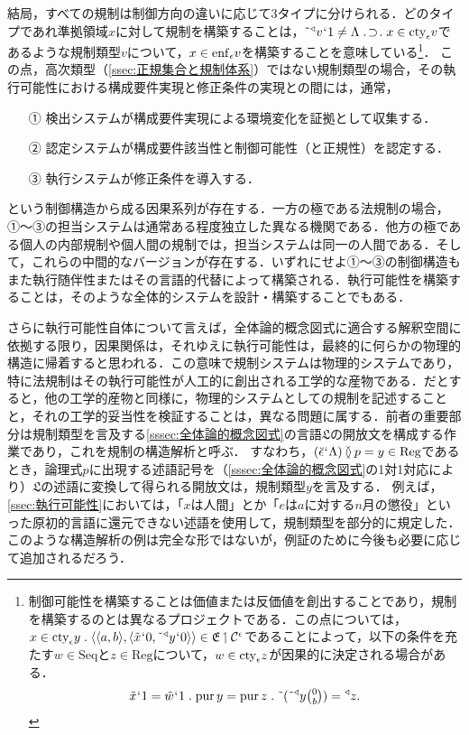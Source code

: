 結局，すべての規制は制御方向の違いに応じて3タイプに分けられる．どのタイプであれ準拠領域$x$に対して規制を構築することは，$ \tildel{\trgl{v}}\fap 1 \neq\Lambda \case{1}{1}{1}x\in\cty{\epsilon}v $であるような規制類型$v$について，$ x\in\mathrm{enf}_{\epsilon}v $を構築することを意味している\footnote{
    制御可能性を構築することは価値または反価値を創出することであり，規制を構築するのとは異なるプロジェクトである．この点については，
    $ x\in\cty{\epsilon}y \con{1} \orp{\orp{a,b},\orp{\tilde{x}\fap 0,\tildel{\trgl{y}}\fap 0}}\in \mathfrak{E}\uphl\mathcal{C}^\epsilon $であることによって，以下の条件を充たす$ w\in\mathrm{Seq} $と$ z\in\mathrm{Reg} $について，$ w\in \mathrm{cty}_{\epsilon}z $が因果的に決定される場合がある．
    \[
        \tilde{x}\fap 1 = \tilde{w}\fap 1\con{1}\mathrm{pur}\,y = \mathrm{pur}\,z\con{1}\tildel{(\tildel{\trgl{y}}\tbinom{0}{b})} = \trgl{z}.
    \]}．
この点，高次類型（\ref{ssec:正規集合と規制体系}）ではない規制類型の場合，その執行可能性における構成要件実現と修正条件の実現との間には，通常，
\begin{enumerate}
    \item[①] 検出システムが構成要件実現による環境変化を証拠として収集する．
    \item[②] 認定システムが構成要件該当性と制御可能性（と正規性）を認定する．
    \item[③] 執行システムが修正条件を導入する．
\end{enumerate}
という制御構造から成る因果系列が存在する．一方の極である法規制の場合，①〜③の担当システムは通常ある程度独立した異なる機関である．他方の極である個人の内部規制や個人間の規制では，担当システムは同一の人間である．そして，これらの中間的なバージョンが存在する．いずれにせよ①〜③の制御構造もまた執行随伴性またはその言語的代替によって構築される．執行可能性を構築することは，そのような全体的システムを設計・構築することでもある．

さらに執行可能性自体について言えば，全体論的概念図式に適合する解釈空間に依拠する限り，因果関係は，それゆえに執行可能性は，最終的に何らかの物理的構造に帰着すると思われる．この意味で規制システムは物理的システムであり，特に法規制はその執行可能性が人工的に創出される工学的な産物である．だとすると，他の工学的産物と同様に，物理的システムとしての規制を記述することと，それの工学的妥当性を検証することは，異なる問題に属する．前者の重要部分は規制類型を言及する\ref{sssec:全体論的概念図式}の言語$\mathfrak{L}$の開放文を構成する作業であり，これを規制の構造解析と呼ぶ．
すなわち，$ (\breve{\epsilon}{\mspace{1mu}{`}\mspace{1mu}}\Lambda)\mathbin{\between} p = y\in\mathrm{Reg} $であるとき，論理式$p$に出現する述語記号を（\ref{sssec:全体論的概念図式}の1対1対応により）$\mathfrak{L}$の述語に変換して得られる開放文は，規制類型$y$を言及する．
例えば，\ref{ssec:執行可能性}においては，「$x$は人間」とか「$e$は$a$に対する$n$月の懲役」といった原初的言語に還元できない述語を使用して，規制類型を部分的に規定した．このような構造解析の例は完全な形ではないが，例証のために今後も必要に応じて追加されるだろう．

